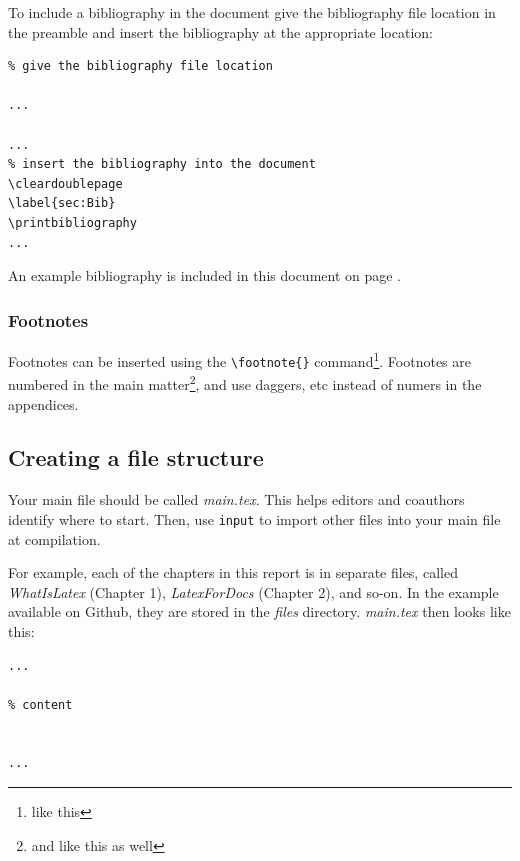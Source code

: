 To include a bibliography in the document give the bibliography file location in the preamble and insert the bibliography at the appropriate location:

\begin{lstlisting}
% give the bibliography file location

...

...
% insert the bibliography into the document
\cleardoublepage
\label{sec:Bib}
\printbibliography
...

\end{lstlisting}

An example bibliography is included in this document on page \pageref{sec:Bib}.

\subsubsection{Footnotes}
Footnotes can be inserted using the \verb+\footnote{}+ command\footnote{like this}. Footnotes are numbered in the main matter\footnote{and like this as well}, and use daggers, etc instead of numers in the appendices.

\subsection{Creating a file structure}
\label{sec:FileStructure}
Your main file should be called \emph{main.tex}. This helps editors and coauthors identify where to start. Then, use \texttt{input} to import other files into your main file at compilation.

For example, each of the chapters in this report is in separate files, called \emph{WhatIsLatex} (Chapter 1), \emph{LatexForDocs} (Chapter 2), and so-on. In the example available on Github, they are stored in the \emph{files} directory. \emph{main.tex} then looks like this:

\begin{lstlisting}
...

% content


...
\end{lstlisting}

